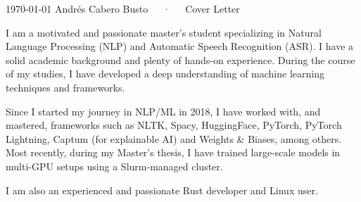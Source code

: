 \documentclass[11pt, a4paper]{awesome-cv}
\begin{document}
\makecvheader[R]

\makecvfooter
  {\today}
  {Andrés Cabero Busto~~~·~~~Cover Letter}
  {}

\makelettertitle

\begin{cvletter}

I am a motivated and passionate master's student specializing in Natural Language Processing (NLP) and Automatic Speech Recognition (ASR). I have a solid academic background and plenty of hands-on experience. During the course of my studies, I have developed a deep understanding of machine learning techniques and frameworks. 

Since I started my journey in NLP/ML in 2018, I have worked with, and mastered, frameworks such as NLTK, Spacy, HuggingFace, PyTorch, PyTorch Lightning, Captum (for explainable AI) and Weights \& Biases, among others. Most recently, during my Master's thesis, I have trained large-scale models in multi-GPU setups using a Slurm-managed cluster.

I am also an experienced and passionate Rust developer and Linux user. 



\end{cvletter}
\end{document}
